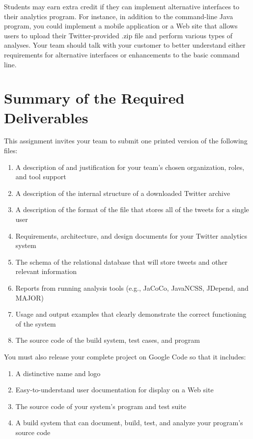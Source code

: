 Students may earn extra credit if they can implement alternative interfaces to their analytics program.  For instance, in
addition to the command-line Java program, you could implement a mobile application or a Web site that allows users to
upload their Twitter-provided .zip file and perform various types of analyses. Your team should talk with your customer
to better understand either requirements for alternative interfaces or enhancements to the basic command line. 

\section*{Summary of the Required Deliverables}

This assignment invites your team to submit one printed version of the following files:
\vspace*{-.1in}
\begin{enumerate}
	\itemsep0em 
	\item A description of and justification for your team's chosen organization, roles, and tool support
	\item A description of the internal structure of a downloaded Twitter archive
	\item A description of the format of the file that stores all of the tweets for a single user
	\item Requirements, architecture, and design documents for your Twitter analytics system
	\item The schema of the relational database that will store tweets and other relevant information
	\item Reports from running analysis tools (e.g., JaCoCo, JavaNCSS, JDepend, and MAJOR) 
	\item Usage and output examples that clearly demonstrate the correct functioning of the system
	\item The source code of the build system, test cases, and program
\end{enumerate}
You must also release your complete project on Google Code so that it includes:
\vspace*{-.1in}

\begin{enumerate}
		\itemsep0em 
		\item A distinctive name and logo
		\item Easy-to-understand user documentation for display on a Web site
		\item The source code of your system's program and test suite
		\item A build system that can document, build, test, and analyze your program's source code
\end{enumerate}

